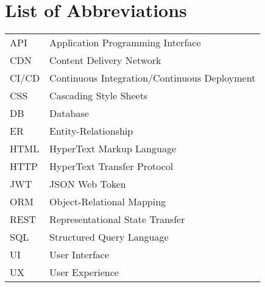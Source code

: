 \chapter*{List of Abbreviations}

\begin{tabular}{ll}
API & Application Programming Interface \\
CDN & Content Delivery Network \\
CI/CD & Continuous Integration/Continuous Deployment \\
CSS & Cascading Style Sheets \\
DB & Database \\
ER & Entity-Relationship \\
HTML & HyperText Markup Language \\
HTTP & HyperText Transfer Protocol \\
JWT & JSON Web Token \\
ORM & Object-Relational Mapping \\
REST & Representational State Transfer \\
SQL & Structured Query Language \\
UI & User Interface \\
UX & User Experience \\
\end{tabular} 